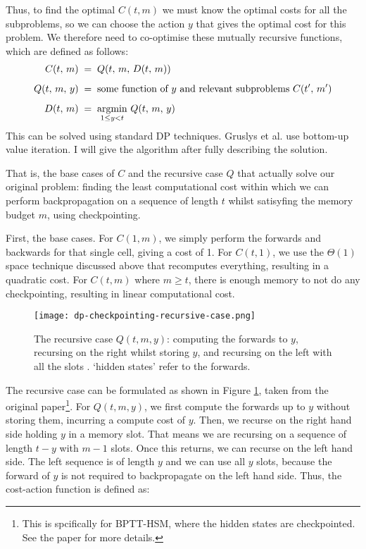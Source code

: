 Thus, to find the optimal \(C(t, m)\) we must know the optimal costs for all the subproblems, so we can choose the action \(y\) that gives the optimal cost for this problem.
We therefore need to co-optimise these mutually recursive functions, which are defined as follows:
\begin{align*}
    C(t,\, m)      \;&=\; Q(t,\, m,\, D(t,\, m))\\[0.5em]
    Q(t,\, m,\, y) \;&=\; \text{some function of } y \text{ and relevant subproblems } C(t^\prime,\, m^\prime)\\[0.5em]
    D(t,\, m)      \;&=\; \mathop{\mathrm{argmin}}_{1\leq y < t}\, Q(t,\, m,\, y)
\end{align*}
This can be solved using standard DP techniques. Gruslys et al. use bottom-up value iteration.
I will give the algorithm after fully describing the solution.

That is, the base cases of \(C\) and the recursive case \(Q\) that actually solve our original problem: finding the least computational cost within which we can perform backpropagation on a sequence of length \(t\) whilst satisyfing the memory budget \(m\), using checkpointing.

First, the base cases. 
For \(C(1, m)\), we simply perform the forwards and backwards for that single cell, giving a cost of 1.
For \(C(t, 1)\), we use the \(\Theta(1)\) space technique discussed above that recomputes everything, resulting in a quadratic cost.
For \(C(t, m)\) where \(m \geq t\), there is enough memory to not do any checkpointing, resulting in linear computational cost.

\begin{figure}[thb]
    \centering
    \texttt{[image: dp-checkpointing-recursive-case.png]}
    \caption{The recursive case \(Q(t, m, y)\): computing the forwards to \(y\), recursing on the right whilst storing \(y\), and recursing on the left with all the slots \cite[Figure~1]{Gruslys2016}. `hidden states' refer to the forwards.}
    \label{fig:2-dp-checkpointing-rec}
\end{figure}

The recursive case can be formulated as shown in Figure \ref{fig:2-dp-checkpointing-rec}, taken from the original paper\footnote{This is spcifically for BPTT-HSM, where the hidden states are checkpointed. See the paper for more details.}.
For \(Q(t, m, y)\), we first compute the forwards up to \(y\) without storing them, incurring a compute cost of \(y\).
Then, we recurse on the right hand side holding \(y\) in a memory slot.
That means we are recursing on a sequence of length \(t-y\) with \(m-1\) slots.
Once this returns, we can recurse on the left hand side.
The left sequence is of length \(y\) and we can use all \(y\) slots, because the forward of \(y\) is not required to backpropagate on the left hand side.
Thus, the cost-action function is defined as:

